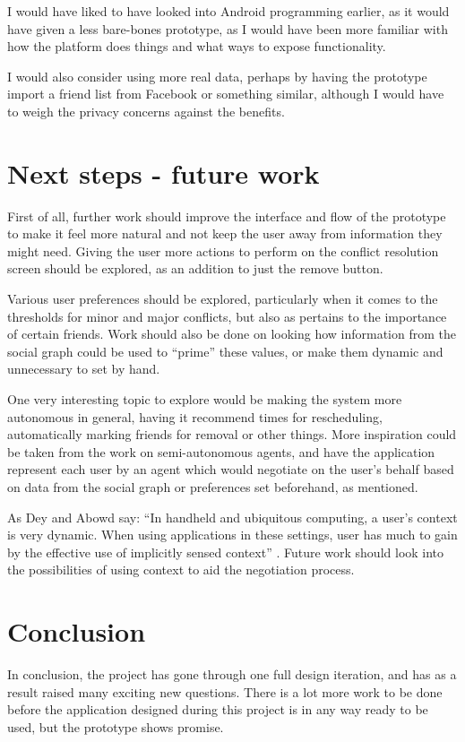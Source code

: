 \documentclass[a4paper,11pt]{report}
\begin{document}
I would have liked to have looked into Android programming earlier, as it would
have given a less bare-bones prototype, as I would have been more familiar with
how the platform does things and what ways to expose functionality.

I would also consider using more real data, perhaps by having the prototype
import a friend list from Facebook or something similar, although I would have
to weigh the privacy concerns against the benefits.

\section{Next steps - future work}

First of all, further work should improve the interface and flow of the
prototype to make it feel more natural and not keep the user away from
information they might need. Giving the user more actions to perform on the
conflict resolution screen should be explored, as an addition to just the remove
button.

Various user preferences should be explored, particularly when it comes to the
thresholds for minor and major conflicts, but also as pertains to the importance
of certain friends. Work should also be done on looking how information from the
social graph could be used to ``prime'' these values, or make them dynamic and
unnecessary to set by hand.

One very interesting topic to explore would be making the system more autonomous
in general, having it recommend times for rescheduling, automatically marking
friends for removal or other things. More inspiration could be taken from the
work on semi-autonomous agents, and have the application represent each user by
an agent which would negotiate on the user's behalf based on data from the
social graph or preferences set beforehand, as mentioned.

As Dey and Abowd say\cite{dey99:towar}: ``In handheld and ubiquitous computing,
a user's context is very dynamic. When using applications in these settings,
user has much to gain by the effective use of implicitly sensed context''
. Future work should look into the possibilities of using context to aid the
negotiation process.

\section{Conclusion}

In conclusion, the project has gone through one full design iteration, and has
as a result raised many exciting new questions. There is a lot more work to be
done before the application designed during this project is in any way ready to
be used, but the prototype shows promise.
\end{document}
